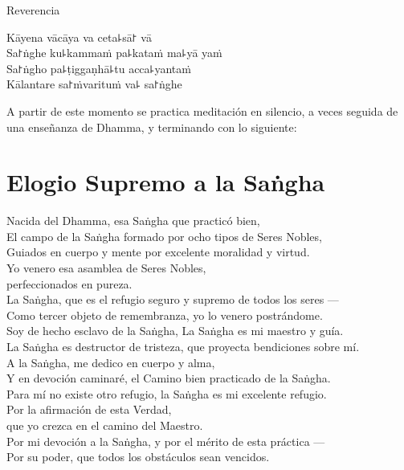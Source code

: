 \enlargethispage{\baselineskip}

\vfill

\begin{instruction}
  Reverencia
\end{instruction}

Kāyena vācāya va ceta꜕sā꜓ vā\\
Sa꜓ṅghe ku꜕kammaṁ pa꜕kataṁ ma꜕yā yaṁ\\
Sa꜓ṅgho pa꜕ṭiggaṇhā꜕tu acca꜕yantaṁ\\
Kālantare sa꜓ṁvarituṁ va꜕ sa꜓ṅghe

\vfill

\begin{instruction}
  A partir de este momento se practica meditación en silencio, a veces seguida de una enseñanza de Dhamma, y terminando con lo siguiente:
\end{instruction}

\clearpage

\nextChapterUseDelegatedPageNumber

\chapter{Elogio Supremo a la Saṅgha}

\begin{leader}
\end{leader}

Nacida del Dhamma, esa Saṅgha que practicó bien,\\
El campo de la Saṅgha formado por ocho tipos de Seres Nobles,\\
Guiados en cuerpo y mente por excelente moralidad y virtud.\\
Yo venero esa asamblea de Seres Nobles,\\
\vin perfeccionados en pureza.\\
La Saṅgha, que es el refugio seguro y supremo de todos los seres ---\\
Como tercer objeto de remembranza, yo lo venero postrándome.\\
Soy de hecho esclavo de la Saṅgha, La Saṅgha es mi maestro y guía.\\
La Saṅgha es destructor de tristeza, que proyecta bendiciones sobre mí.\\
A la Saṅgha, me dedico en cuerpo y alma,\\
Y en devoción caminaré, el Camino bien practicado de la Saṅgha.\\
Para mí no existe otro refugio, la Saṅgha es mi excelente refugio.\\
Por la afirmación de esta Verdad,\\
\vin que yo crezca en el camino del Maestro.\\
Por mi devoción a la Saṅgha, y por el mérito de esta práctica ---\\
Por su poder, que todos los obstáculos sean vencidos.

